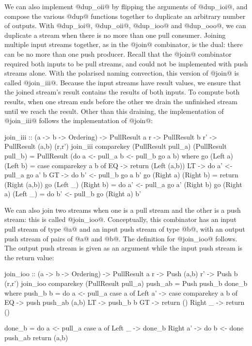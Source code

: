 We can also implement @dup_oii@ by flipping the arguments of @dup_ioi@, and compose the various @dup@ functions together to duplicate an arbitrary number of outputs.
With @dup_ioi@, @dup_oii@, @dup_ioo@ and @dup_ooo@, we can duplicate a stream when there is no more than one pull consumer.
Joining multiple input streams together, as in the @join@ combinator, is the dual: there can be no more than one push producer.
Recall that the @join@ combinator required both inputs to be pull streams, and could not be implemented with push streams alone.
With the polarised naming convection, this version of @join@ is called @join_iii@.
Because the input streams have result values, we ensure that the joined stream's result contains the results of both inputs.
To compute both results, when one stream ends before the other we drain the unfinished stream until we reach the result.
Other than this draining, the implementation of @join_iii@ follows the implementation of @join@:

\begin{haskell}
join_iii :: (a -> b -> Ordering)
         -> PullResult a r
         -> PullResult b r'
         -> PullResult (a,b) (r,r')
join_iii comparekey (PullResult pull_a) (PullResult pull_b) = PullResult (do
   a <- pull_a
   b <- pull_b
   go a b)
 where
  go (Left a) (Left b)
   = case comparekey a b of
      EQ -> return (Left (a,b))
      LT -> do
        a' <- pull_a
        go a' b
      GT -> do
        b' <- pull_b
        go a b'
  go (Right a) (Right b) = return (Right (a,b))
  go (Left _) (Right b) = do
    a' <- pull_a
    go a' (Right b)
  go (Right a) (Left _) = do
    b' <- pull_b
    go (Right a) b'
\end{haskell}


We can also join two streams when one is a pull stream and the other is a push stream: this is called @join_ioo@.
Conceptually, this combinator has an input pull stream of type @a@ and an input push stream of type @b@, with an output push stream of pairs of @a@ and @b@.
The definition for @join_ioo@ follows.
The output push stream is given as an argument while the input push stream is the return value:

\begin{haskell}
join_ioo :: (a -> b -> Ordering)
         -> PullResult a r
         -> Push (a,b) r'
         -> Push b (r,r')
join_ioo comparekey (PullResult pull_a) push_ab = Push push_b done_b
 where
  push_b b = do
    a <- pull_a
    case a of
     Left a' -> case comparekey a b of
      EQ -> push push_ab (a,b)
      LT -> push_b b
      GT -> return ()
     Right _ -> return () 

  done_b = do
    a <- pull_a
    case a of
     Left _ -> done_b
     Right a' -> do
      b <- done push_ab
      return (a,b)
\end{haskell}

